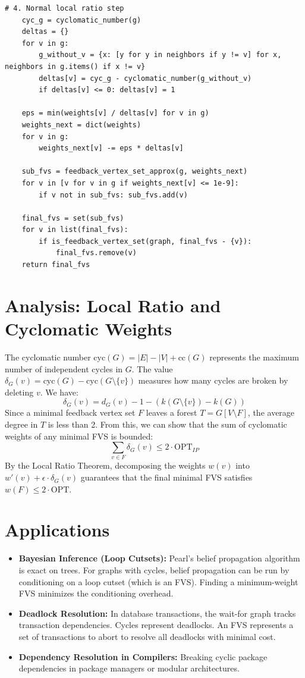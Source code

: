 \documentclass[11pt,oneside]{book}
\begin{document}
\begin{lstlisting}[style=python, caption=Local Ratio Algorithm for Feedback Vertex Set]
    # 4. Normal local ratio step
    cyc_g = cyclomatic_number(g)
    deltas = {}
    for v in g:
        g_without_v = {x: [y for y in neighbors if y != v] for x, neighbors in g.items() if x != v}
        deltas[v] = cyc_g - cyclomatic_number(g_without_v)
        if deltas[v] <= 0: deltas[v] = 1

    eps = min(weights[v] / deltas[v] for v in g)
    weights_next = dict(weights)
    for v in g:
        weights_next[v] -= eps * deltas[v]
        
    sub_fvs = feedback_vertex_set_approx(g, weights_next)
    for v in [v for v in g if weights_next[v] <= 1e-9]:
        if v not in sub_fvs: sub_fvs.add(v)
            
    final_fvs = set(sub_fvs)
    for v in list(final_fvs):
        if is_feedback_vertex_set(graph, final_fvs - {v}):
            final_fvs.remove(v)
    return final_fvs
\end{lstlisting}

\section{Analysis: Local Ratio and Cyclomatic Weights}
The cyclomatic number $\text{cyc}(G) = |E| - |V| + \text{cc}(G)$ represents the maximum number of independent cycles in $G$.
The value $\delta_G(v) = \text{cyc}(G) - \text{cyc}(G \setminus \{v\})$ measures how many cycles are broken by deleting $v$. We have:
\[
\delta_G(v) = d_G(v) - 1 - (k(G \setminus \{v\}) - k(G))
\]
Since a minimal feedback vertex set $F$ leaves a forest $T = G[V \setminus F]$, the average degree in $T$ is less than 2. From this, we can show that the sum of cyclomatic weights of any minimal FVS is bounded:
\[
\sum_{v \in F} \delta_G(v) \le 2 \cdot \text{OPT}_{IP}
\]
By the Local Ratio Theorem, decomposing the weights $w(v)$ into $w'(v) + \epsilon \cdot \delta_G(v)$ guarantees that the final minimal FVS satisfies $w(F) \le 2 \cdot \text{OPT}$.

\section{Applications}
\begin{itemize}
    \item \textbf{Bayesian Inference (Loop Cutsets):} Pearl's belief propagation algorithm is exact on trees. For graphs with cycles, belief propagation can be run by conditioning on a loop cutset (which is an FVS). Finding a minimum-weight FVS minimizes the conditioning overhead.
    \item \textbf{Deadlock Resolution:} In database transactions, the wait-for graph tracks transaction dependencies. Cycles represent deadlocks. An FVS represents a set of transactions to abort to resolve all deadlocks with minimal cost.
    \item \textbf{Dependency Resolution in Compilers:} Breaking cyclic package dependencies in package managers or modular architectures.
\end{itemize}
\end{document}
